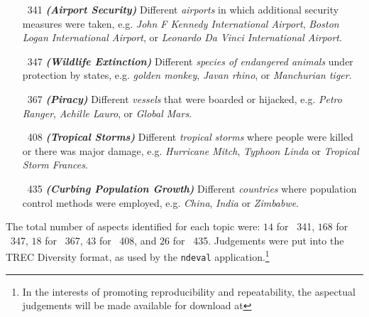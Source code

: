 \begin{itemize}
    \item[\textnumero~341]{\textbf{\emph{(Airport Security)}} Different \emph{airports} in which additional security measures were taken, e.g. \emph{John F Kennedy International Airport}, \emph{Boston Logan International Airport}, or \emph{Leonardo Da Vinci International Airport}.}
    \item[\textnumero~347]{\textbf{\emph{(Wildlife Extinction)}} Different \emph{species of endangered animals} under protection by states, e.g. \emph{golden monkey}, \emph{Javan rhino}, or \emph{Manchurian tiger}.}
    \item[\textnumero~367]{\textbf{\emph{(Piracy)}} Different \emph{vessels} that were boarded or hijacked, e.g. \emph{Petro Ranger}, \emph{Achille Lauro}, or \emph{Global Mars}.}
    \item[\textnumero~408]{\textbf{\emph{(Tropical Storms)}} Different \emph{tropical storms} where people were killed or there was major damage, e.g. \emph{Hurricane Mitch}, \emph{Typhoon Linda} or \emph{Tropical Storm Frances}.}
    \item[\textnumero~435]{\textbf{\emph{(Curbing Population Growth)}} Different \emph{countries} where population control methods were employed, e.g. \emph{China}, \emph{India} or \emph{Zimbabwe}.}
\end{itemize}

The total number of aspects identified for each topic were: $14$ for \textnumero~341, $168$ for \textnumero~347, $18$ for \textnumero~367, $43$ for \textnumero~408, and $26$ for \textnumero~435. Judgements were put into the TREC Diversity format, as used by the \texttt{ndeval} application.\footnote{In the interests of promoting reproducibility and repeatability, the aspectual judgements will be made available for download at} %

